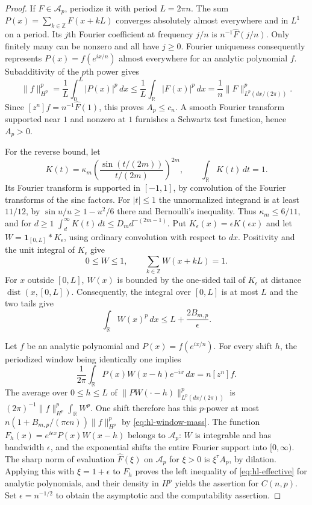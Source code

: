\documentclass[11pt]{article}
\begin{document}
\begin{proof}
If \(F\in\mathcal A_p\), periodize it with period \(L=2\pi n\).
The sum \(P(x)=\sum_{k\in\mathbb Z}F(x+kL)\) converges absolutely
almost everywhere and in \(L^1\) on a period. Its \(j\)th Fourier
coefficient at frequency \(j/n\) is \(n^{-1}\widehat F(j/n)\).
Only finitely many can be nonzero and all have \(j\geq0\).
Fourier uniqueness consequently represents \(P(x)=f(e^{ix/n})\)
almost everywhere for an analytic polynomial \(f\). Subadditivity
of the \(p\)th power gives
\[
 \|f\|_{H^p}^p=\frac1L\int_0^L |P(x)|^p\,dx
 \leq\frac1L\int_{\mathbb R}|F(x)|^p\,dx
 =\frac1n\|F\|_{L^p(dx/(2\pi))}^p.
\]
Since \([z^n]f=n^{-1}\widehat F(1)\), this proves \(A_p\leq c_n\).
A smooth Fourier transform supported near \(1\) and nonzero at
\(1\) furnishes a Schwartz test function, hence \(A_p>0\).

For the reverse bound, let
\[
 K(t)=\kappa_m
  \left(\frac{\sin(t/(2m))}{t/(2m)}\right)^{2m},
 \qquad \int_{\mathbb R}K(t)\,dt=1 .
\]
Its Fourier transform is supported in \([-1,1]\), by convolution
of the Fourier transforms of the sinc factors. For \(|t|\leq1\)
the unnormalized integrand is at least \(11/12\), by
\(\sin u/u\geq1-u^2/6\) there and Bernoulli's inequality.
Thus \(\kappa_m\leq6/11\), and for \(d\geq1\)
\(\int_d^\infty K(t)\,dt\leq D_m d^{-(2m-1)}\).
Put \(K_\epsilon(x)=\epsilon K(\epsilon x)\) and let
\(W=\mathbf1_{[0,L]}*K_\epsilon\), using ordinary convolution
with respect to \(dx\). Positivity and the unit integral of
\(K_\epsilon\) give
\[
   0\leq W\leq1,\qquad
   \sum_{k\in\mathbb Z}W(x+kL)=1 .
\]
For \(x\) outside \([0,L]\), \(W(x)\) is bounded by the one-sided
tail of \(K_\epsilon\) at distance \(\operatorname{dist}(x,[0,L])\).
Consequently, the integral over \([0,L]\) is at most \(L\) and
the two tails give
\begin{equation}\label{eq:hl-window-mass}
 \int_{\mathbb R} W(x)^p\,dx\leq L+\frac{2B_{m,p}}{\epsilon}.
\end{equation}

Let \(f\) be an analytic polynomial and \(P(x)=f(e^{ix/n})\).
For every shift \(h\), the periodized window being identically
one implies
\[
 \frac1{2\pi}\int_{\mathbb R}P(x)W(x-h)e^{-ix}\,dx
       =n[z^n]f.
\]
The average over \(0\leq h\leq L\) of
\(\|PW(\cdot-h)\|_{L^p(dx/(2\pi))}^p\) is
\((2\pi)^{-1}\|f\|_{H^p}^p\int_{\mathbb R}W^p\).
One shift therefore has this \(p\)-power at most
\(n(1+B_{m,p}/(\pi\epsilon n))\|f\|_{H^p}^p\)
by \eqref{eq:hl-window-mass}.
The function \(F_h(x)=e^{i\epsilon x}P(x)W(x-h)\) belongs
to \(\mathcal A_p\): \(W\) is integrable and has bandwidth
\(\epsilon\), and the exponential shifts the entire Fourier
support into \([0,\infty)\).
The sharp norm of evaluation \(\widehat F(\xi)\) on
\(\mathcal A_p\) for \(\xi>0\) is \(\xi^\tau A_p\), by dilation.
Applying this with \(\xi=1+\epsilon\) to \(F_h\) proves the left
inequality of \eqref{eq:hl-effective} for analytic polynomials,
and their density in \(H^p\) yields the assertion for \(C(n,p)\).
Set \(\epsilon=n^{-1/2}\) to obtain the asymptotic and the
computability assertion.
\end{proof}
\end{document}
